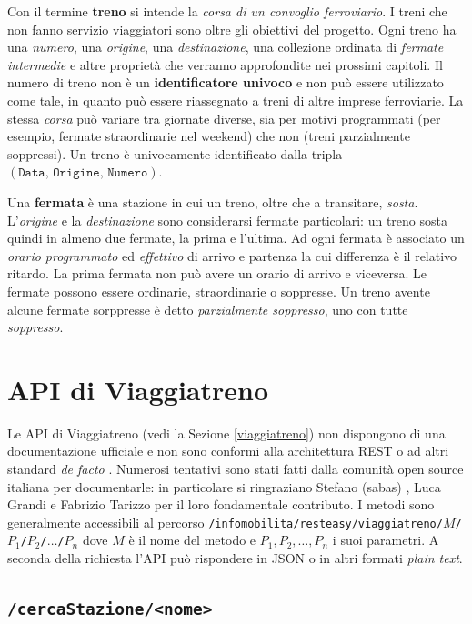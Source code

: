 \documentclass[12pt,italian]{report}
\begin{document}
Con il termine \textbf{treno} si intende la \textit{corsa di un
    convoglio ferroviario}.  I treni che non fanno servizio
viaggiatori sono oltre gli obiettivi del progetto.  Ogni treno ha una
\textit{numero}, una \textit{origine}, una \textit{destinazione}, una
collezione ordinata di \textit{fermate intermedie} e altre proprietà
che verranno approfondite nei prossimi capitoli.  Il numero di treno
non è un \textbf{identificatore univoco} e non può essere utilizzato
come tale, in quanto può essere riassegnato a treni di altre imprese
ferroviarie.  La stessa \textit{corsa} può variare tra giornate
diverse, sia per motivi programmati (per esempio, fermate
straordinarie nel weekend) che non (treni parzialmente soppressi).  Un
treno è univocamente identificato dalla tripla
$(\texttt{Data}, \, \texttt{Origine}, \, \texttt{Numero})$.

Una \textbf{fermata} è una stazione in cui un treno, oltre che a
transitare, \textit{sosta}.  L'\textit{origine} e la
\textit{destinazione} sono considerarsi fermate particolari: un treno
sosta quindi in almeno due fermate, la prima e l'ultima.  Ad ogni
fermata è associato un \textit{orario programmato} ed
\textit{effettivo} di arrivo e partenza la cui differenza è il
relativo ritardo.  La prima fermata non può avere un orario di arrivo
e viceversa.  Le fermate possono essere ordinarie, straordinarie o
soppresse.  Un treno avente alcune fermate sorppresse è detto
\textit{parzialmente soppresso}, uno con tutte \textit{soppresso}.

\section{API di Viaggiatreno}

Le API di Viaggiatreno (vedi la Sezione \ref{viaggiatreno}) non
dispongono di una documentazione ufficiale e non sono conformi alla
architettura REST o ad altri standard \textit{de facto} \cite{Giunta}.
Numerosi tentativi sono stati fatti dalla comunità open source
italiana per documentarle: in particolare si ringraziano Stefano
(sabas) \cite{Sabas}, Luca Grandi \cite{Grandi} e Fabrizio Tarizzo
\cite{Tarizzo} per il loro fondamentale contributo.  I metodi sono
generalmente accessibili al percorso
\texttt{/infomobilita/\-resteasy/\-viaggiatreno/\-$M$/\-$P_1$/\-$P_2$/\-$\dots$/\-$P_n$}
dove $M$ è il nome del metodo e $P_1, P_2, \dots, P_n$ i suoi
parametri. A seconda della richiesta l'API può rispondere in JSON o in
altri formati \textit{plain text}.


\subsection{\texttt{/cercaStazione/<nome>}}
\label{cercaStazione}
\end{document}
